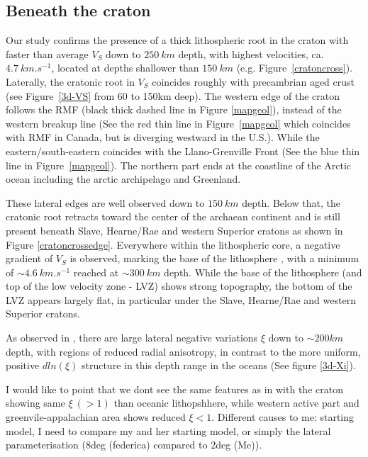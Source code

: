 \documentclass[12pt]{article}
\begin{document}
	\subsection{Beneath the craton}


		Our study confirms the presence of a thick lithospheric root in the craton with faster than average $V_S$ down to $250 \: km$ depth, with highest velocities, ca. $4.7 \: km.s^{-1}$, located at depths shallower than  $150 \: km$ (e.g. Figure~\ref{cratoncross}). 
		Laterally, the cratonic root in $V_S$ coincides roughly with precambrian aged crust (see Figure~\ref{3d-VS} from 60 to 150km deep).
		The western edge of the craton follows the RMF (black thick dashed line in Figure \ref{mapgeol}), instead of the western breakup line (See the red thin line in Figure~\ref{mapgeol} which coincides with RMF in Canada, but is diverging westward in the U.S.). While the eastern/south-eastern coincides with the Llano-Grenville Front (See the blue thin line in Figure~\ref{mapgeol}). 
		The northern part ends at the coastline of the Arctic ocean including the arctic archipelago and Greenland. 

		These lateral edges are well observed down to $150 \: km$ depth. 
		Below that, the cratonic root retracts toward the center of the archaean continent and is still present beneath Slave, Hearne/Rae and western Superior cratons as shown in Figure \ref{cratoncrossedge}. 
		Everywhere within the lithospheric core, a negative gradient of $V_S$ is observed, marking the base of the lithosphere \citep{eaton2009elusive}, with a minimum of $\sim 4.6 \: km.s^{-1}$ reached at $\sim 300 \: km$ depth. 
		While the base of the lithosphere (and top of the low velocity zone - LVZ) shows strong topography, the bottom of the LVZ appears largely flat, in particular under the Slave, Hearne/Rae and western Superior cratons.

		As observed in \cite{babuvska1998age,gung2003global,yuan2014lithospheric}, there are large lateral negative variations $\xi$ down to $\sim 200km$ depth, with regions of reduced radial anisotropy, in contrast to the more uniform, positive $dln(\xi)$ structure in this depth range in the oceans (See figure \ref{3d-Xi}). 
		
		{\color{red} I would like to point that we dont see the same features as in \cite{marone2007three} with the craton showing same $\xi \: (> 1)$ than oceanic lithopshhere, while western active part and greenvile-appalachian area shows reduced $\xi < 1$. Different causes to me: starting model, I need to compare my and her starting model, or simply the lateral parameterisation (8deg (federica) compared to 2deg (Me)).}
\end{document}
